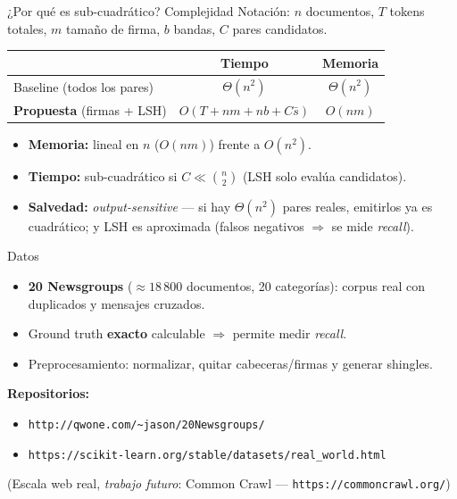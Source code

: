 \documentclass[aspectratio=169,11pt]{beamer}
\begin{document}
\begin{frame}{¿Por qué es sub-cuadrático? Complejidad}
  \small
  Notación: $n$ documentos, $T$ tokens totales, $m$ tamaño de firma,
  $b$ bandas, $C$ pares candidatos.
  \vspace{0.6em}

  \begin{center}
  \begin{tabular}{lcc}
    \toprule
     & \textbf{Tiempo} & \textbf{Memoria} \\
    \midrule
    Baseline (todos los pares) & $\Theta(n^2)$ & $\Theta(n^2)$ \\
    \textbf{Propuesta} (firmas + LSH) & $O(T + nm + nb + C\bar{s})$ & $O(nm)$ \\
    \bottomrule
  \end{tabular}
  \end{center}
  \vspace{0.4em}

  \begin{itemize}
    \item \textbf{Memoria:} lineal en $n$ ($O(nm)$) frente a $O(n^2)$.
    \item \textbf{Tiempo:} sub-cuadrático si $C \ll \binom{n}{2}$
          (LSH solo evalúa candidatos).
    \item \textbf{Salvedad:} \emph{output-sensitive} --- si hay $\Theta(n^2)$
          pares reales, emitirlos ya es cuadrático; y LSH es aproximada
          (falsos negativos $\Rightarrow$ se mide \emph{recall}).
  \end{itemize}
\end{frame}

\begin{frame}{Datos}
  \begin{itemize}
    \item \textbf{20 Newsgroups} ($\approx 18\,800$ documentos, 20 categorías):
          corpus real con duplicados y mensajes cruzados.
    \item Ground truth \textbf{exacto} calculable $\Rightarrow$ permite medir \emph{recall}.
    \item Preprocesamiento: normalizar, quitar cabeceras/firmas y generar shingles.
  \end{itemize}
  \vfill
  \textbf{Repositorios:}
  \begin{itemize}
    \item \texttt{http://qwone.com/\textasciitilde jason/20Newsgroups/}
    \item \texttt{https://scikit-learn.org/stable/datasets/real\_world.html}
  \end{itemize}
  \vfill
  \footnotesize (Escala web real, \emph{trabajo futuro}: Common Crawl ---
  \texttt{https://commoncrawl.org/})
\end{frame}
\end{document}
